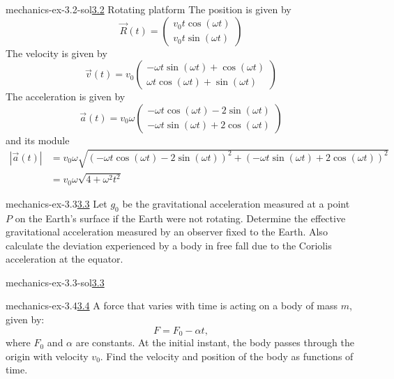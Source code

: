 \documentclass[preview]{standalone}
\begin{document}
\begin{snippetsolution}{mechanics-ex-3.2-sol}{\underline{3.2} Rotating platform}
    The position is given by
    \[
        \vec{R}(t) = \begin{pmatrix}
            v_0t\cos(\omega t) \\
            v_0t\sin(\omega t)
        \end{pmatrix}
    \]
    The velocity is given by
    \[
        \vec{v}(t) = v_0 \begin{pmatrix}
            -\omega t \sin(\omega t) + \cos(\omega t) \\
            \omega t \cos(\omega t) + \sin(\omega t)
        \end{pmatrix}
    \]
    The acceleration is given by
    \[
        \vec{a}(t) = v_0 \omega \begin{pmatrix}
            -\omega t \cos(\omega t) - 2\sin(\omega t) \\
            -\omega t \sin(\omega t) + 2\cos(\omega t)
        \end{pmatrix}
    \]
    and its module
    \begin{align*}
        |\vec{a}(t)| &= v_0 \omega \sqrt{
            {(-\omega t \cos(\omega t) - 2\sin(\omega t))}^2 + {(-\omega t \sin(\omega t) + 2\cos(\omega t))}^2
        } \\
        &= v_0 \omega \sqrt{4 + \omega^2t^2}
    \end{align*}
\end{snippetsolution}

\begin{snippetexercise}{mechanics-ex-3.3}{\underline{3.3}}
    Let $g_0$ be the gravitational acceleration measured at a point $P$ on the Earth's surface if the Earth were not rotating. Determine the effective gravitational acceleration measured by an observer fixed to the Earth. Also calculate the deviation experienced by a body in free fall due to the Coriolis acceleration at the equator.
\end{snippetexercise}

\begin{snippetsolution}{mechanics-ex-3.3-sol}{\underline{3.3}}
    \todo
\end{snippetsolution}

\begin{snippetexercise}{mechanics-ex-3.4}{\underline{3.4}}
    A force that varies with time is acting on a body of mass $m$, given by:
    \[
        F = F_0 - \alpha t,
    \]
    where $F_0$ and $\alpha$ are constants. At the initial instant, the body passes through the origin with velocity $v_0$. Find the velocity and position of the body as functions of time.
\end{snippetexercise}
\end{document}
